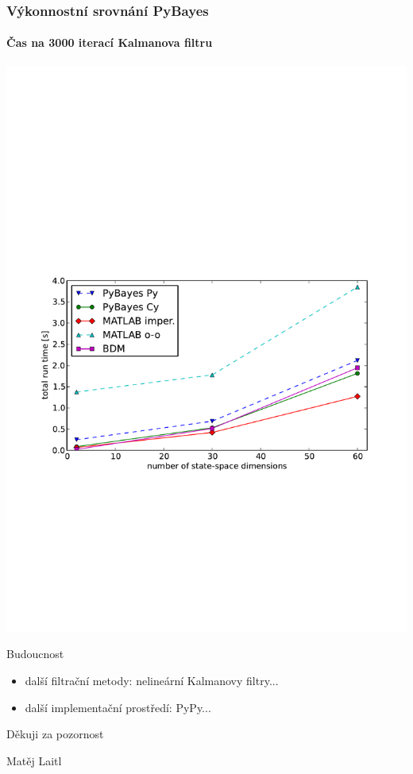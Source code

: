 \documentclass[12pt]{beamer}
\begin{document}
\begin{frame}
	\frametitle{Výkonnostní srovnání PyBayes}
	\framesubtitle{Čas na 3000 iterací Kalmanova filtru}

	\includegraphics[width=\textwidth,keepaspectratio=true,clip=true,trim=19mm 85mm 20mm
111mm]{../KFPerf.pdf}
\end{frame}


\begin{frame}
	\begin{block}{Budoucnost}
		\begin{itemize}
			\item další filtrační metody: nelineární Kalmanovy filtry...
			\item další implementační prostředí: PyPy...
		\end{itemize}
	\end{block}

	\vspace{1cm}
	{\huge Děkuji za pozornost}

	\vspace{1cm}
	\begin{flushright}
		Matěj Laitl

	\end{flushright}
\end{frame}
\end{document}

